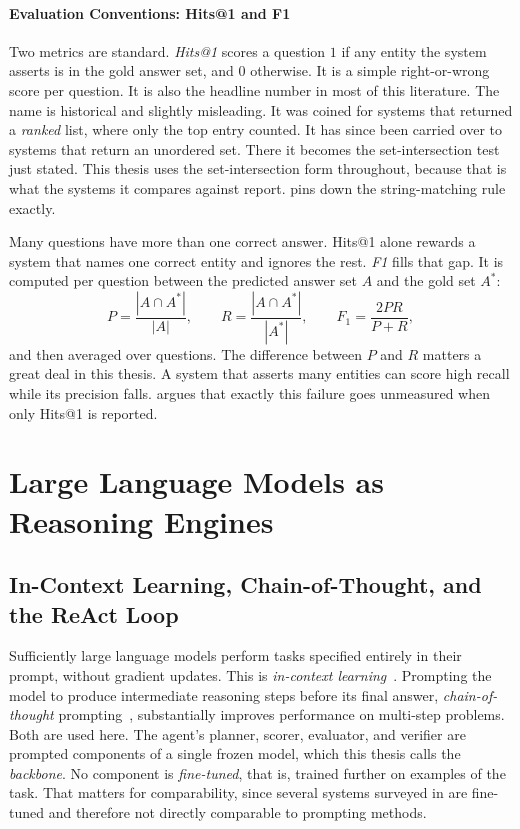 \paragraph{Evaluation Conventions: Hits@1 and F1}

Two metrics are standard. \emph{Hits@1} scores a question
$1$ if any entity the system asserts is in the gold answer set, and
$0$ otherwise. It is a simple right-or-wrong score per question. It is also the
headline number in most of this literature. The name is historical and slightly
misleading. It was coined for systems that returned a \emph{ranked} list, where
only the top entry counted. It has since been carried over to systems that
return an unordered set. There it becomes the set-intersection test just stated.
This thesis uses the set-intersection form throughout, because that is what the
systems it compares against report.  pins down the
string-matching rule exactly.

Many questions have more than one correct answer. Hits@1 alone rewards a system
that names one correct entity and ignores the rest. \emph{F1} fills that gap. It
is computed per question between the predicted answer set $A$ and the gold set
$A^{*}$: \[ P = \frac{|A \cap A^{*}|}{|A|}, \qquad R = \frac{|A \cap
A^{*}|}{|A^{*}|}, \qquad F_1 = \frac{2PR}{P + R}, \] and then averaged over
questions. The difference between $P$ and $R$ matters a great deal in this
thesis. A system that asserts many entities can score high recall while its
precision falls.  argues that exactly this failure goes
unmeasured when only Hits@1 is reported.

\section{Large Language Models as Reasoning Engines}\label{sec:llms}

\subsection{In-Context Learning, Chain-of-Thought, and the ReAct Loop}

Sufficiently large language models perform tasks specified entirely in their
prompt, without gradient updates. This is \emph{in-context
learning}~\cite{brown2020language}. Prompting the
model to produce intermediate reasoning steps before its final answer,
\emph{chain-of-thought} prompting~\cite{wei2022chain}, substantially improves
performance on multi-step problems. Both are used here. The agent's planner,
scorer, evaluator, and verifier are prompted components of a single frozen
model, which this thesis calls the \emph{backbone}. No component is
\emph{fine-tuned}, that is, trained further on examples of the task. That
matters for comparability, since several systems surveyed in
 are fine-tuned and therefore not directly comparable
to prompting methods.

